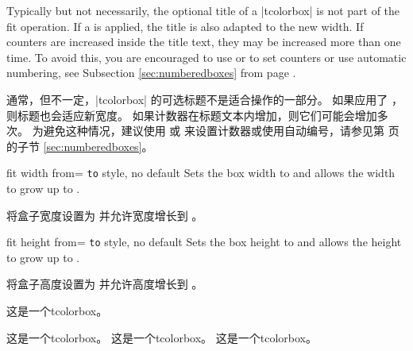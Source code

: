 \begin{marker}
Typically but not necessarily, the optional title of a |tcolorbox| is not part of the fit operation.
If a  is applied, the title is also adapted to
the new width. If counters are increased inside the title text, they may be
increased more than one time.
To avoid this, you are encouraged to use  or 
to set counters or use automatic numbering, see Subsection \ref{sec:numberedboxes}
from page \pageref{sec:numberedboxes}.

通常，但不一定，|tcolorbox| 的可选标题不是适合操作的一部分。
如果应用了 ，则标题也会适应新宽度。
如果计数器在标题文本内增加，则它们可能会增加多次。
为避免这种情况，建议使用  或  来设置计数器或使用自动编号，请参见第 \pageref{sec:numberedboxes} 页的子节 \ref{sec:numberedboxes}。
\end{marker}


\begin{docTcbKey}{fit width from}{= \texttt{to} }{style, no default}
Sets the box width to  and allows the width to grow up to .

将盒子宽度设置为  并允许宽度增长到 。
\begin{dispExample}

\begin{tcolorbox}[fit,width=\linewidth/2]
\lipsum[2]
\end{tcolorbox}\par
\begin{tcolorbox}[fit width from=\linewidth/2 to \linewidth]
\lipsum[2]
\end{tcolorbox}\par
\end{dispExample}
\end{docTcbKey}

 
\begin{docTcbKey}{fit height from}{= \texttt{to} }{style, no default}
Sets the box height to  and allows the height to grow up to .

将盒子高度设置为  并允许高度增长到 。
\begin{dispExample}

\begin{mybox}
这是一个tcolorbox。
\end{mybox}
\begin{mybox}
这是一个tcolorbox。 这是一个tcolorbox。 这是一个tcolorbox。
\end{mybox}
\begin{mybox}
\lipsum[2]
\end{mybox}
\end{dispExample}
\end{docTcbKey}
